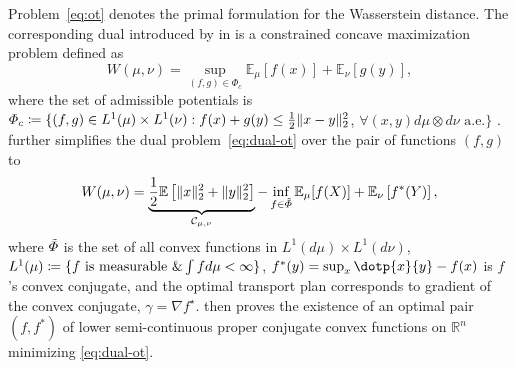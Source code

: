 Problem~\eqref{eq:ot} denotes the primal formulation for the Wasserstein distance. The corresponding dual introduced by \citeauthor{kantorovich1942transfer} in \citeyear{kantorovich1942transfer} is a constrained concave maximization problem defined as
\begin{equation} \label{eq:dual-ot}
    W(\mu, \nu)=\sup _{(f, g) \in \Phi_{c}} \mathbb{E}_{\mu}[f(x)]+\mathbb{E}_{\nu}[g(y)],
\end{equation}
where the set of admissible potentials is $\Phi_c \coloneqq \{(f, g) \in L^{1}(\mu) \times L^{1}(\nu): f(x)+g(y) \leq \frac{1}{2}\|x-y\|_{2}^{2}$, $\forall(x, y) d\mu \otimes d\nu \text{ a.e.}\}$ \citep[Theorem 1.3]{villani2021topics}.
\citet[Theorem 2.9]{villani2021topics} further simplifies the dual problem~\eqref{eq:dual-ot} over the pair of functions $(f, g)$ to
\begin{equation} \label{eq:dual-ot-cvx}
    W(\mu, \nu)= \underbrace{\frac{1}{2}\mathbb{E}\left[\|x\|_{2}^{2}+\|y\|_{2}^{2}\right]}_{\mathcal{C}_{\mu, \nu}}-\inf _{f \in \Tilde{\Phi}} \mathbb{E}_{\mu}[f(X)]+\mathbb{E}_{\nu}\left[f^{*}(Y)\right],
\end{equation}
where $\Tilde{\Phi}$ is the set of all convex functions in $L^1(d\mu) \times L^1(d\nu)$, $L^{1}(\mu) \coloneqq \{f \text{ is measurable } \& \int f d\mu<\infty\}$, $f^*(y) = \sup_x \dotp{x}{y} - f(x)$ is $f$'s convex conjugate, and the optimal transport plan corresponds to gradient of the convex conjugate, $\gamma = \nabla f^\star$. %
\citet[Theorem 2.9]{villani2021topics} then proves the existence of an optimal pair $(f, f^*)$ of lower semi-continuous proper conjugate convex functions on $\mathbb{R}^n$ minimizing \eqref{eq:dual-ot}.


